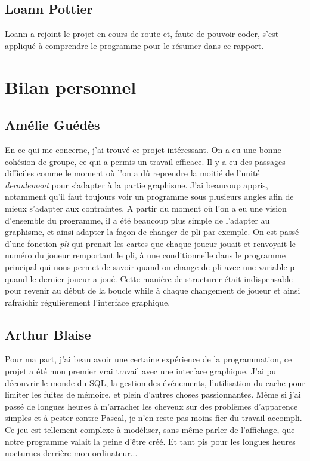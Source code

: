 \documentclass[12pt]{report}
\begin{document}
\subsection*{Loann Pottier}
Loann a rejoint le projet en cours de route et, faute de pouvoir coder, s'est appliqué à comprendre le programme pour le résumer dans ce rapport.


\clearpage
\section{Bilan personnel}
\subsection{Amélie Guédès}
En ce qui me concerne, j'ai trouvé ce projet intéressant. On a eu une bonne cohésion de groupe, ce qui a permis un travail efficace. Il y a eu des passages difficiles comme le moment où l’on a dû reprendre la moitié de l'unité \textit{deroulement} pour s'adapter à la partie graphisme. J'ai beaucoup appris, notamment qu'il faut toujours voir un programme sous plusieurs angles afin de mieux s'adapter aux contraintes. A partir du moment où l'on a eu une vision d'ensemble du programme, il a été beaucoup plus simple de l'adapter au graphisme, et ainsi adapter la façon de changer de pli par exemple. On est passé d'une fonction \textit{pli} qui prenait les cartes que chaque joueur jouait et renvoyait le numéro du joueur remportant le pli, à une conditionnelle dans le programme principal qui nous permet de savoir quand on change de pli avec une variable p quand le dernier joueur a joué. Cette manière de structurer était indispensable pour revenir au début de la boucle while à chaque changement de joueur et ainsi rafraîchir régulièrement l'interface graphique.

\vspace{15pt}

\subsection{Arthur Blaise}
Pour ma part, j'ai beau avoir une certaine expérience de la programmation, ce projet a été mon premier vrai travail avec une interface graphique. J'ai pu découvrir le monde du SQL, la gestion des événements, l'utilisation du cache pour limiter les fuites de mémoire, et plein d'autres choses passionnantes. Même si j'ai passé de longues heures à m'arracher les cheveux sur des problèmes d'apparence simples et à pester contre Pascal, je n'en reste pas moins fier du travail accompli. Ce jeu est tellement complexe à modéliser, sans même parler de l'affichage, que notre programme valait la peine d'être créé. Et tant pis pour les longues heures nocturnes derrière mon ordinateur...
\end{document}
